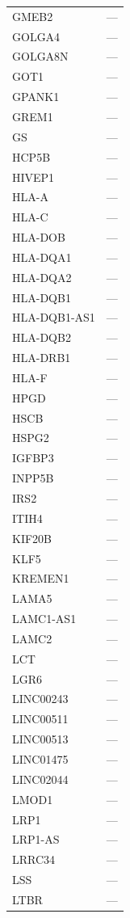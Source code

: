 \begin{longtable}{ll}
  GMEB2 & --- \\
  GOLGA4 & --- \\
  GOLGA8N & --- \\
  GOT1 & --- \\
  GPANK1 & --- \\
  GREM1 & --- \\
  GS & --- \\
  HCP5B & --- \\
  HIVEP1 & --- \\
  HLA-A & --- \\
  HLA-C & --- \\
  HLA-DOB & --- \\
  HLA-DQA1 & --- \\
  HLA-DQA2 & --- \\
  HLA-DQB1 & --- \\
  HLA-DQB1-AS1 & --- \\
  HLA-DQB2 & --- \\
  HLA-DRB1 & --- \\
  HLA-F & --- \\
  HPGD & --- \\
  HSCB & --- \\
  HSPG2 & --- \\
  IGFBP3 & --- \\
  INPP5B & --- \\
  IRS2 & --- \\
  ITIH4 & --- \\
  KIF20B & --- \\
  KLF5 & --- \\
  KREMEN1 & --- \\
  LAMA5 & --- \\
  LAMC1-AS1 & --- \\
  LAMC2 & --- \\
  LCT & --- \\
  LGR6 & --- \\
  LINC00243 & --- \\
  LINC00511 & --- \\
  LINC00513 & --- \\
  LINC01475 & --- \\
  LINC02044 & --- \\
  LMOD1 & --- \\
  LRP1 & --- \\
  LRP1-AS & --- \\
  LRRC34 & --- \\
  LSS & --- \\
  LTBR & --- \\

\end{longtable}
